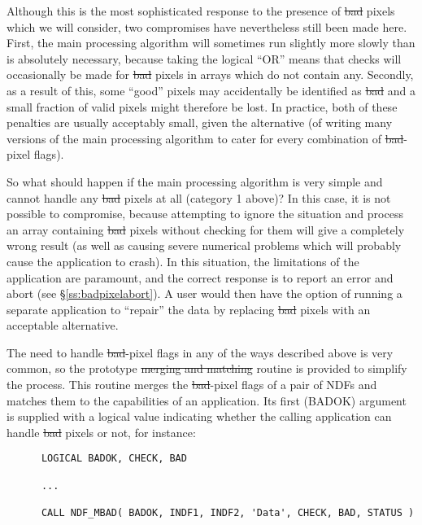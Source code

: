 Although this is the most sophisticated response to the presence of
\st{bad\/} pixels which we will consider, two compromises have
nevertheless 
still been made here. 
First, the main processing algorithm will sometimes run slightly more slowly
than is absolutely necessary, because taking the logical ``OR'' means that
checks will occasionally be made for \st{bad\/} pixels in arrays which do not
contain any. 
Secondly, as a result of this, some ``good'' pixels may accidentally be
identified as \st{bad\/} and a small fraction of valid pixels might therefore
be lost. 
In practice, both of these penalties are usually acceptably small, given the
alternative (of writing many versions of the main processing algorithm to
cater for every combination of \st{bad\/}-pixel flags). 

So what should happen if the main processing algorithm is very simple and
cannot handle any \st{bad\/} pixels at all (category 1 above)? 
In this case, it is not possible to compromise, because attempting to ignore
the situation and process an array containing \st{bad\/} pixels without
checking for them will give a completely wrong result (as well as causing
severe numerical problems which will probably cause the application to
crash). 
In this situation, the limitations of the application are paramount, and the
correct response is to report an error and abort (see 
\S\ref{ss:badpixelabort}). 
A user would then have the option of running a separate application to
``repair'' the data by replacing \st{bad\/} pixels with an acceptable
alternative. 

The need to handle \st{bad\/}-pixel flags in any of the ways described above
is very common, so the prototype \st{merging and matching\/} routine
 is provided to simplify the process.
This routine merges the \st{bad\/}-pixel flags of a pair of NDFs and matches
them to the capabilities of an application.
Its first (BADOK) argument is supplied with a logical value indicating whether
the calling application can handle \st{bad\/} pixels or not, for instance: 

\small
\begin{verbatim}
      LOGICAL BADOK, CHECK, BAD

      ...

      CALL NDF_MBAD( BADOK, INDF1, INDF2, 'Data', CHECK, BAD, STATUS )
\end{verbatim}
\normalsize

